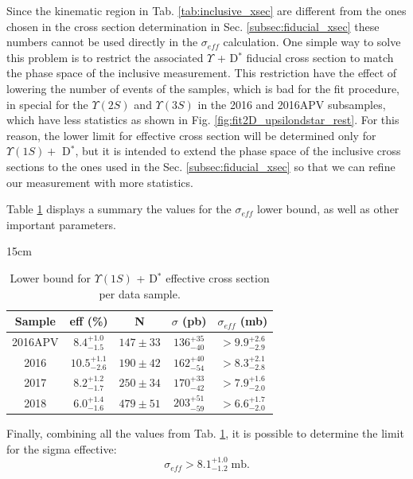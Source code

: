 Since the kinematic region in Tab. \ref{tab:inclusive_xsec} are different from the ones chosen in the cross section determination in Sec. \ref{subsec:fiducial_xsec} these numbers cannot be used directly in the $\sigma_{eff}$ calculation. One simple way to solve this problem is to restrict the associated $\Upsilon$ + D$^*$ fiducial cross section to match the phase space of the inclusive measurement. This restriction have the effect of lowering the number of events of the samples, which is bad for the fit procedure, in special for the $\Upsilon(2S)$ and $\Upsilon(3S)$ in the 2016 and 2016APV subsamples, which have less statistics as shown in Fig. \ref{fig:fit2D_upsilondstar_rest}. For this reason, the lower limit for effective cross section will be determined only for $\Upsilon(1S) +$ D$^*$, but it is intended to extend the phase space of the inclusive cross sections to the ones used in the Sec. \ref{subsec:fiducial_xsec} so that we can refine our measurement with more statistics.

Table \ref{tab:xsec_eff} displays a summary the values for the $\sigma_{eff}$ lower bound, as well as other important parameters.

\begin{table}[!htbp]{15cm}
  \caption{Lower bound for $\Upsilon(1S)$ + D$^{*}$ effective cross section per data sample.}
  \begin{tabular}{ c | c | c | c | c }
    \hline
    Sample  & eff (\%)             & N            & $\sigma$ (pb)     & $\sigma_{eff}$ (mb)  \\ \hline
    2016APV & $8.4^{+1.0}_{-1.5}$  & $147 \pm 33$ & $136^{+35}_{-40}$ & $>9.9^{+2.6}_{-2.9}$ \\ \hline
    2016    & $10.5^{+1.1}_{-2.6}$ & $190 \pm 42$ & $162^{+40}_{-54}$ & $>8.3^{+2.1}_{-2.8}$ \\ \hline
    2017    & $8.2^{+1.2}_{-1.7}$  & $250 \pm 34$ & $170^{+33}_{-42}$ & $>7.9^{+1.6}_{-2.0}$ \\ \hline
    2018    & $6.0^{+1.4}_{-1.6}$  & $479 \pm 51$ & $203^{+51}_{-59}$ & $>6.6^{+1.7}_{-2.0}$ \\ \hline
  \end{tabular}
  \label{tab:xsec_eff}
\end{table}

Finally, combining all the values from Tab. \ref{tab:xsec_eff}, it is possible to determine the limit for the sigma effective:
\begin{equation}
  \sigma_{eff} > 8.1^{+1.0}_{-1.2} \; \text{mb}.
\end{equation}


